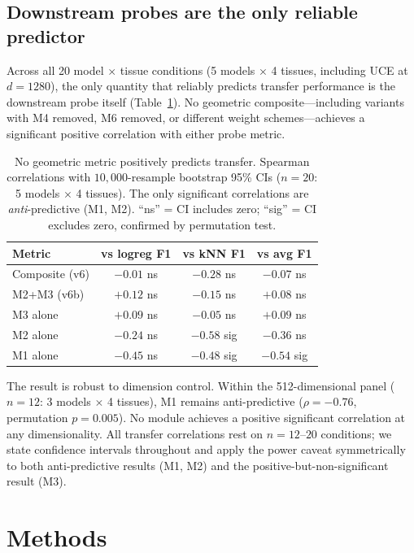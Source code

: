 \documentclass[10pt,letterpaper]{article}
\begin{document}
\subsection{Downstream probes are the only reliable predictor}

Across all 20 model $\times$ tissue conditions (5 models $\times$ 4 tissues, including UCE at $d = 1280$), the only quantity that reliably predicts transfer performance is the downstream probe itself (Table~\ref{tab:probes}). No geometric composite---including variants with M4 removed, M6 removed, or different weight schemes---achieves a significant positive correlation with either probe metric.

\begin{table}[t]
\centering
\caption{No geometric metric positively predicts transfer. Spearman correlations with $10{,}000$-resample bootstrap 95\% CIs ($n = 20$: 5 models $\times$ 4 tissues). The only significant correlations are \emph{anti}-predictive (M1, M2). ``ns'' = CI includes zero; ``sig'' = CI excludes zero, confirmed by permutation test.}
\label{tab:probes}
\small
\begin{tabular}{@{}lccc@{}}
\toprule
Metric & vs logreg F1 & vs kNN F1 & vs avg F1 \\
\midrule
Composite (v6) & $-0.01$ ns & $-0.28$ ns & $-0.07$ ns \\
M2+M3 (v6b) & $+0.12$ ns & $-0.15$ ns & $+0.08$ ns \\
M3 alone & $+0.09$ ns & $-0.05$ ns & $+0.09$ ns \\
M2 alone & $-0.24$ ns & $\mathbf{-0.58}$ sig & $-0.36$ ns \\
M1 alone & $-0.45$ ns & $\mathbf{-0.48}$ sig & $\mathbf{-0.54}$ sig \\
\bottomrule
\end{tabular}
\end{table}

The result is robust to dimension control. Within the 512-dimensional panel ($n = 12$: 3 models $\times$ 4 tissues), M1 remains anti-predictive ($\rho = -0.76$, permutation $p = 0.005$). No module achieves a positive significant correlation at any dimensionality. All transfer correlations rest on $n = 12$--$20$ conditions; we state confidence intervals throughout and apply the power caveat symmetrically to both anti-predictive results (M1, M2) and the positive-but-non-significant result (M3).


\section{Methods}
\end{document}
